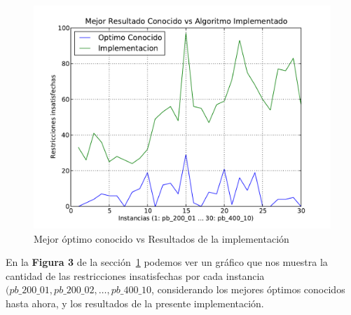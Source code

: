 \begin{figure}[htb!]
	\begin{center}
	\includegraphics[scale=0.6]{img/fig3}
	\end{center}
	\label{fig:fig3}
	\caption{Mejor óptimo conocido vs Resultados de la implementación}
\end{figure}

En la \textbf{Figura 3} de la sección~\ref{fig:fig3} podemos ver un gráfico que nos muestra la cantidad de las restricciones insatisfechas
por cada instancia $(pb\_200\_01, pb\_200\_02,\ldots, pb\_400\_10$, considerando los mejores óptimos conocidos hasta ahora,
y los resultados de la presente implementación.

